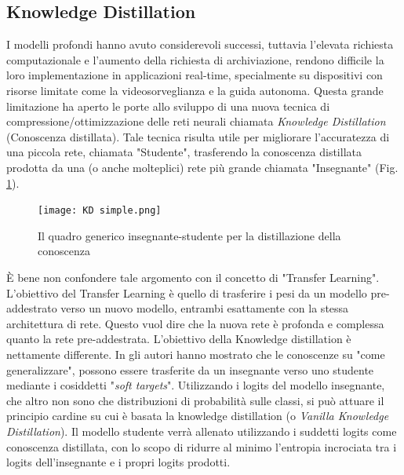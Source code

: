 \subsection{Knowledge Distillation}\label{KD_distill}
I modelli profondi hanno avuto considerevoli successi, tuttavia l'elevata richiesta 
computazionale e l'aumento della richiesta di archiviazione, rendono 
difficile la loro implementazione in applicazioni real-time, specialmente su 
dispositivi con risorse limitate come la videosorveglianza e la guida autonoma. 
Questa grande limitazione ha aperto le porte allo sviluppo di una 
nuova tecnica di compressione/ottimizzazione delle reti neurali chiamata 
\emph{Knowledge Distillation} (Conoscenza distillata). Tale tecnica risulta utile 
per migliorare l'accuratezza di una piccola rete, chiamata "Studente", trasferendo 
la conoscenza distillata prodotta da una (o anche molteplici) rete 
più grande chiamata "Insegnante" (Fig. \ref{KD_simple}).
\begin{figure}
    \centering
    \texttt{[image: KD simple.png]}
    \centering
    \caption{Il quadro generico insegnante-studente per la distillazione della conoscenza}
    \label{KD_simple}
\end{figure}
È bene non confondere tale 
argomento con il concetto di "Transfer Learning". L'obiettivo del Transfer 
Learning è quello di trasferire i pesi da un modello pre-addestrato verso 
un nuovo modello, entrambi esattamente con la stessa architettura di rete. 
Questo vuol dire che la nuova rete è profonda e complessa quanto la rete pre-addestrata.
L'obiettivo della Knowledge distillation è nettamente differente.
In \cite{hinton2015distilling} gli autori hanno mostrato che le conoscenze su "come generalizzare", 
possono essere trasferite da un insegnante verso uno studente mediante i 
cosiddetti "\emph{soft targets}". Utilizzando i logits del modello insegnante, che 
altro non sono che distribuzioni di probabilità sulle classi, si può attuare 
il principio cardine su cui è basata la knowledge distillation (o \emph{Vanilla 
Knowledge Distillation}). Il modello studente verrà allenato utilizzando i 
suddetti logits come conoscenza distillata, con lo scopo di ridurre al minimo 
l'entropia incrociata tra i logits dell'insegnante e i propri logits prodotti. 
